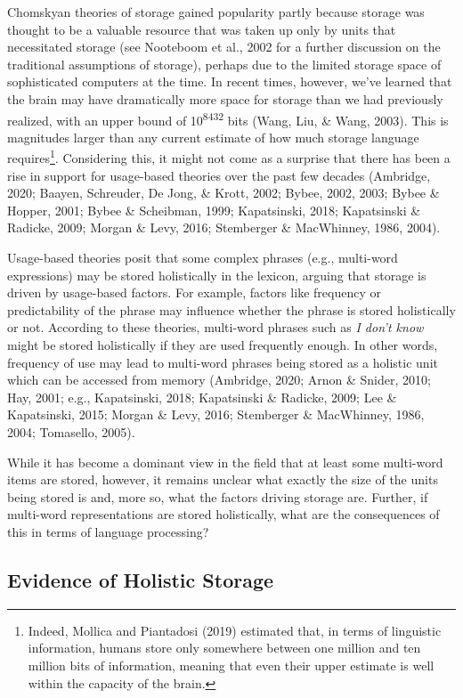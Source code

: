 \documentclass[
  man,floatsintext]{apa6}
\begin{document}
Chomskyan theories of storage gained popularity partly because storage was thought to be a valuable resource that was taken up only by units that necessitated storage (see Nooteboom et al., 2002 for a further discussion on the traditional assumptions of storage), perhaps due to the limited storage space of sophisticated computers at the time. In recent times, however, we've learned that the brain may have dramatically more space for storage than we had previously realized, with an upper bound of 10\textsuperscript{8432} bits (Wang, Liu, \& Wang, 2003). This is magnitudes larger than any current estimate of how much storage language requires\footnote{Indeed, Mollica and Piantadosi (2019) estimated that, in terms of linguistic information, humans store only somewhere between one million and ten million bits of information, meaning that even their upper estimate is well within the capacity of the brain.}. Considering this, it might not come as a surprise that there has been a rise in support for usage-based theories over the past few decades (Ambridge, 2020; Baayen, Schreuder, De Jong, \& Krott, 2002; Bybee, 2002, 2003; Bybee \& Hopper, 2001; Bybee \& Scheibman, 1999; Kapatsinski, 2018; Kapatsinski \& Radicke, 2009; Morgan \& Levy, 2016; Stemberger \& MacWhinney, 1986, 2004).

Usage-based theories posit that some complex phrases (e.g., multi-word expressions) may be stored holistically in the lexicon, arguing that storage is driven by usage-based factors. For example, factors like frequency or predictability of the phrase may influence whether the phrase is stored holistically or not. According to these theories, multi-word phrases such as \emph{I don't know} might be stored holistically if they are used frequently enough. In other words, frequency of use may lead to multi-word phrases being stored as a holistic unit which can be accessed from memory (Ambridge, 2020; Arnon \& Snider, 2010; Hay, 2001; e.g., Kapatsinski, 2018; Kapatsinski \& Radicke, 2009; Lee \& Kapatsinski, 2015; Morgan \& Levy, 2016; Stemberger \& MacWhinney, 1986, 2004; Tomasello, 2005).

While it has become a dominant view in the field that at least some multi-word items are stored, however, it remains unclear what exactly the size of the units being stored is and, more so, what the factors driving storage are. Further, if multi-word representations are stored holistically, what are the consequences of this in terms of language processing?

\subsection{Evidence of Holistic Storage}\label{evidence-of-holistic-storage}
\end{document}
